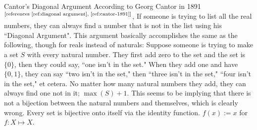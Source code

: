 \documentclass[12pt]{article}
\begin{document}
\begin{section}{Cantor's Diagonal Argument}\label{sec:diagonal argument}
	According to Georg Cantor in 1891$^\text{[references \ref{ref:diagonal argument},
	\ref{ref:cantor-1891}]}$, If someone is trying to list all the real numbers, they can
	always find a number that is not in the list using his ``Diagonal Argument". This
	argument basically accomplishes the same as the following, though for reals instead of
	naturals: Suppose someone is trying to make a set $S$ with every natural number. They
	first add zero to the set and the set is $\{0\}$, then they could say, ``one isn't in
	the set." When they add one and have $\{0,1\}$, they can say ``two isn't in the set,"
	then ``three isn't in the set," ``four isn't in the set," et cetera. No matter how many
	natural numbers they add, they can always find one not in it; $\max(S)+1$. This seems
	to be implying that there is not a bijection between the natural numbers and themselves,
	which is clearly wrong. Every set is bijective onto itself via the identity function.
	$f(x) := x$ for  $f:X\mapsto X$.
\end{section}
\end{document}
